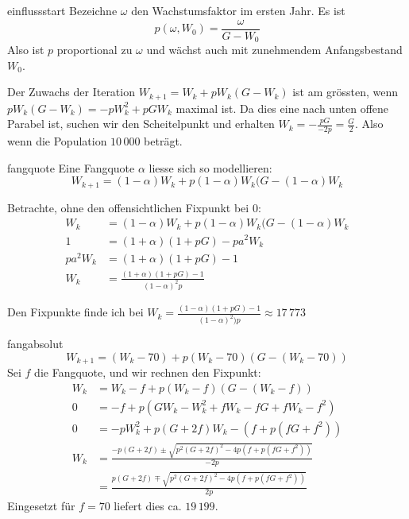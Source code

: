 \documentclass[%
<<<<<<< Updated upstream
11pt,%
twoside,%
titlepage,%
german,%
headsepline%
]{scrartcl}
\begin{document}
\begin{lsg}{einflussstart}
    Bezeichne $\omega$ den Wachstumsfaktor im ersten Jahr. Es ist
    $$p(\omega,W_0)=\frac{\omega}{G-W_0}$$
    Also ist $p$ proportional zu $\omega$ und wächst auch mit zunehmendem Anfangsbestand $W_0$.

    Der Zuwachs der Iteration $W_{k+1} = W_k+pW_k(G-W_k)$ ist am grössten, wenn $pW_k(G-W_k)=-pW_k^2+pGW_k$ maximal ist. Da dies eine nach unten offene Parabel ist, suchen wir den Scheitelpunkt und erhalten $W_k=-\frac{pG}{-2p}=\frac{G}{2}$. Also wenn die Population $10\,000$ beträgt.
\end{lsg}
\begin{lsg}{fangquote}
    Eine Fangquote $\alpha$ liesse sich so modellieren:
    $$W_{k+1}=(1-\alpha)W_k+p(1-\alpha)W_k(G-(1-\alpha)W_k$$

    Betrachte, ohne den offensichtlichen Fixpunkt bei $0$:
    \begin{align*}
        W_{k} &= (1-\alpha)W_k+p(1-\alpha)W_k(G-(1-\alpha)W_k\\
        1 &= (1+\alpha)(1+pG)-pa^2W_k\\
        pa^2W_k &= (1+\alpha)(1+pG)-1\\
        W_k &= \frac{(1+\alpha)(1+pG)-1}{(1-\alpha)^2p}
    \end{align*}
    
    Den Fixpunkte finde ich bei $W_k=\frac{(1-\alpha)(1+pG)-1}{(1-\alpha)^2)p}\approx17\,773$
\end{lsg}

\begin{lsg}{fangabsolut}
    $$W_{k+1}=(W_k-70)+p(W_k-70)(G-(W_k-70))$$
 Sei $f$ die Fangquote, und wir rechnen den Fixpunkt:
    \begin{align*}
        W_{k} &= W_k-f+p(W_k-f)(G-(W_k-f))\\
        0 &= -f+p(GW_k-W_k^2+fW_k-fG+fW_k-f^2)\\
        0 &= -pW_k^2+p(G+2f)W_k-(f+p(fG+f^2))\\
        W_k &= \frac{-p(G+2f)\pm\sqrt{p^2(G+2f)^2-4p(f+p(fG+f^2))}}{-2p}\\
        &= \frac{p(G+2f)\mp\sqrt{p^2(G+2f)^2-4p(f+p(fG+f^2))}}{2p}
    \end{align*}
    Eingesetzt für $f=70$ liefert dies ca. $19\,199$.
\end{lsg}

\clearpage
\end{document}
